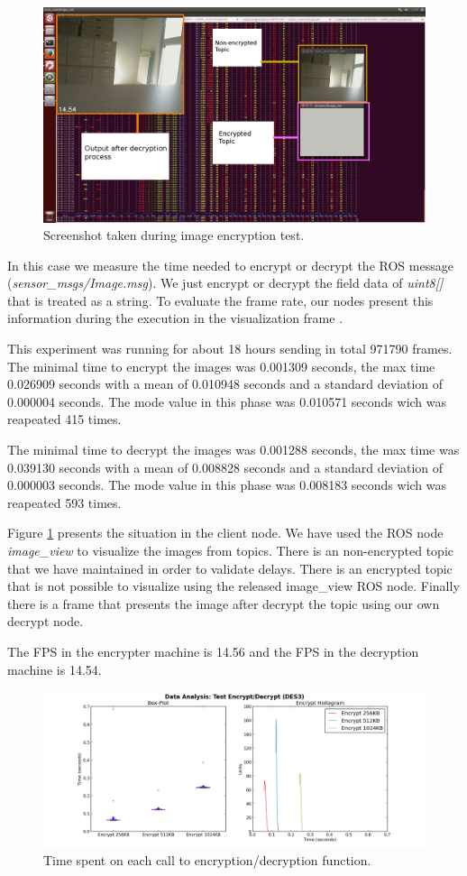 \documentclass[journal,twoside]{JoPhA}
\begin{document}
\begin{figure}[ht]
    \centering
    \includegraphics[width=.5\textwidth]{Screenshot.png}
    \caption{Screenshot taken during image encryption test.}
  \label{fig:screenshot}
\end{figure}

In this case we measure the time needed to encrypt or decrypt the ROS message ({\em sensor\_msgs/Image.msg}). We just encrypt or decrypt the field data of {\em uint8[]} that is treated as a string.
To evaluate  the frame rate, our nodes present this information during the execution in the visualization frame . 

This experiment was running for about 18 hours sending in total 971790 frames. The minimal time to encrypt the images was 0.001309 seconds, the max time  0.026909 seconds with a 
mean of  0.010948 seconds and a standard deviation of 0.000004 seconds. The mode value in this phase was 0.010571 seconds wich was reapeated 415 times. 

The minimal time to decrypt the images was 0.001288 seconds, the max time was 0.039130 seconds with a 
mean of  0.008828 seconds and a standard deviation of 0.000003 seconds. The mode value in this phase was 0.008183 seconds wich was reapeated 593 times. 



Figure \ref{fig:screenshot} presents the situation in the client node. We have used the ROS node {\em image\_view} to visualize the images from topics.  There is an non-encrypted topic that we have maintained in order to validate delays. There is an encrypted topic that is not possible to visualize using the released image\_view ROS node. Finally there is a frame that presents the image after decrypt the topic using our own decrypt node. 


The FPS in the encrypter machine is 14.56 and the FPS in the decryption machine is 14.54.



\begin{figure}[ht]
    \centering
    \includegraphics[width=.9\textwidth]{Outline_encryption_text.png}
    \caption{Time spent on each call to encryption/decryption function.}
  \label{fig:text_encryption_time}
\end{figure}
\end{document}
